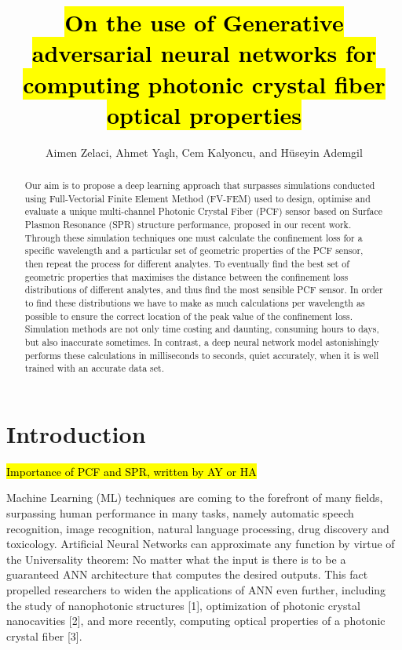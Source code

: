 \documentclass[draft, a4, 10pt, onecolumn]{IEEEtran}
\begin{document}
\title{\hl{On the use of Generative adversarial neural networks for computing photonic crystal fiber optical properties}}

\author{Aimen Zelaci, Ahmet Yaşlı, Cem Kalyoncu, and Hüseyin Ademgil}

\maketitle
	
\begin{abstract}
Our aim is to propose a deep learning approach that surpasses simulations conducted using Full-Vectorial Finite Element Method (FV-FEM) used to design, optimise and evaluate a unique multi-channel Photonic Crystal Fiber (PCF) sensor based on Surface Plasmon Resonance (SPR) structure performance, proposed in our recent work. Through these simulation techniques one must calculate the confinement loss for a specific wavelength and a particular set of geometric properties of the PCF sensor, then repeat the process for different analytes. To eventually find the best set of geometric properties that maximises the distance between the confinement loss distributions of different analytes, and thus find the most sensible PCF sensor. In order to find these distributions we have to make as much calculations per wavelength as possible to ensure the correct location of the peak value of the confinement loss. Simulation methods are not only time costing and daunting, consuming hours to days, but also inaccurate sometimes. In contrast, a deep neural network model astonishingly performs these calculations in milliseconds to seconds, quiet accurately, when it is well trained with an accurate data set.

\end{abstract}

\section{Introduction}

\hl{Importance of PCF and SPR, written by AY or HA}
	
Machine Learning (ML) techniques are coming to the forefront of many fields, surpassing human performance in many tasks, namely automatic speech recognition, image recognition, natural language processing, drug discovery and toxicology. Artificial Neural Networks can approximate any function by virtue of the Universality theorem: No matter what the input is there is to be a guaranteed ANN architecture that computes the desired outputs. This fact propelled researchers to widen the applications of ANN even further, including the study of nanophotonic structures [1], optimization of photonic crystal nanocavities [2], and more recently, computing optical properties of a photonic crystal fiber [3].
\end{document}
